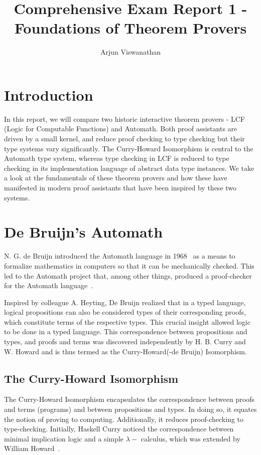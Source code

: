 \documentclass{article}
\begin{document}
\title{Comprehensive Exam Report 1 - Foundations of Theorem Provers}
\author{Arjun Viswanathan}
\date{}
\maketitle

\section{Introduction}
\label{sec:intro}
	In this report, we will compare two historic 
	interactive theorem provers - LCF (Logic for 
	Computable Functions) and Automath. Both proof 
	assistants are driven by a small kernel, and 
	reduce proof checking to type checking but 
	their type systems vary significantly. 
	The Curry-Howard Isomorphism is central 
	to the Automath type system,
	whereas type checking in LCF 
	is reduced to type checking in its 
	implementation language of abstract data 
	type instances. We take a look at the 
	fundamentals of these theorem provers and how 
	these have manifested in modern proof 
	assistants that have been inspired by these 
	two systems.

\section{De Bruijn's Automath}
\label{sec:automath}
	N. G. de Bruijn introduced the Automath 
	language in 
	1968~\cite{deBruijn1983, 10.1007/BFb0060623} 
	as a means to formalize mathematics in 
	computers so that it can be mechanically
	checked. This led to the Automath 
	project that, among other things, 
	produced a proof-checker for the Automath language~\cite{5df50ef4ddff4ff091125a511f563319, 
	c398556a074e49a193d5035ae32aaa79}.

	Inspired by colleague A. Heyting, De Bruijn 
	realized that in a typed language, logical 
	propositions can also be considered types 
	of their corresponding proofs, which  
	constitute terms of the respective types.
	This crucial insight allowed logic to be 
	done in a typed language. This 
	correspondence between propositions 
	and types, and proofs and terms was 
	discovered independently by H. B. Curry 
	and W. Howard and is thus termed as 
	the Curry-Howard(-de Bruijn) Isomorphism.
	
	\subsection{The Curry-Howard Isomorphism}
	\label{sec:curry}
	The Curry-Howard Isomorphism encapsulates 
	the correspondence between proofs and 
	terms (programs) and between propositions
	and types. In doing so, it equates the 
	notion of proving to computing.
	Additionally, it reduces proof-checking 
	to type-checking.
	Initially, Haskell Curry noticed the 
	correspondence between minimal 
	implication logic and a simple 
	$\lambda-$ calculus, which was extended
	by William 
	Howard~\cite{Howard1995-HOWTFN}.
	
\end{document}
